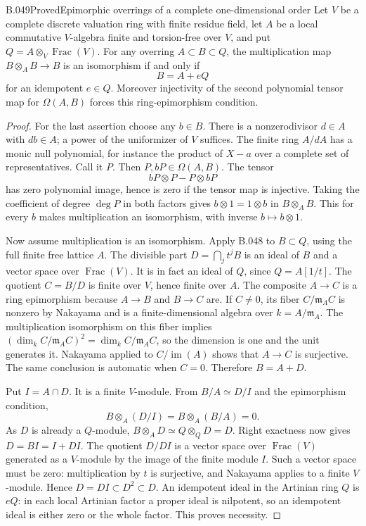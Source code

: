 \begin{saresult}{B.049}{Proved}{Epimorphic overrings of a complete one-dimensional order}
Let $V$ be a complete discrete valuation ring with finite
residue field, let $A$ be a local commutative $V$-algebra
finite and torsion-free over $V$, and put
$Q=A\otimes_V\operatorname{Frac}(V)$.
For any overring $A\subset B\subset Q$, the multiplication
map $B\otimes_A B\to B$ is an isomorphism if and only if
\[
                            B=A+eQ
\]
for an idempotent $e\in Q$. Moreover injectivity of the
second polynomial tensor map for $\Omega(A,B)$ forces
this ring-epimorphism condition.
\end{saresult}
\begin{proof}
For the last assertion choose any $b\in B$. There is
a nonzerodivisor $d\in A$ with $db\in A$; a power
of the uniformizer of $V$ suffices. The finite ring
$A/dA$ has a monic null polynomial, for instance the
product of $X-a$ over a complete set of representatives.
Call it $P$. Then $P,bP\in\Omega(A,B)$. The tensor
\[
                       bP\otimes P-P\otimes bP
\]
has zero polynomial image, hence is zero if the tensor
map is injective. Taking the coefficient of degree
$\deg P$ in both factors gives
$b\otimes1=1\otimes b$ in $B\otimes_A B$.
This for every $b$ makes multiplication an isomorphism,
with inverse $b\mapsto b\otimes1$.

Now assume multiplication is an isomorphism.
Apply B.048 to $B\subset Q$, using the full finite
free lattice $A$. The divisible part
$D=\bigcap_j t^jB$ is an ideal of $B$ and a vector
space over $\operatorname{Frac}(V)$. It is in fact
an ideal of $Q$, since $Q=A[1/t]$. The quotient
$C=B/D$ is finite over $V$, hence finite over $A$.
The composite $A\to C$ is a ring epimorphism because
$A\to B$ and $B\to C$ are. If $C\ne0$, its fiber
$C/\mathfrak m_A C$ is nonzero by Nakayama and is a
finite-dimensional algebra over $k=A/\mathfrak m_A$.
The multiplication isomorphism on this fiber implies
$(\dim_k C/\mathfrak m_A C)^2=\dim_k C/\mathfrak m_A C$,
so the dimension is one and the unit generates it.
Nakayama applied to $C/\operatorname{im}(A)$ shows
that $A\to C$ is surjective. The same conclusion is
automatic when $C=0$. Therefore $B=A+D$.

Put $I=A\cap D$. It is a finite $V$-module. From
$B/A\simeq D/I$ and the epimorphism condition,
\[
              B\otimes_A(D/I)=B\otimes_A(B/A)=0.
\]
As $D$ is already a $Q$-module,
$B\otimes_A D\simeq Q\otimes_QD=D$.
Right exactness now gives $D=BI=I+DI$.
The quotient $D/DI$ is a vector space over
$\operatorname{Frac}(V)$ generated as a $V$-module
by the image of the finite module $I$. Such a vector
space must be zero: multiplication by $t$ is
surjective, and Nakayama applies to a finite
$V$-module. Hence $D=DI\subset D^2\subset D$.
An idempotent ideal in the Artinian ring $Q$ is
$eQ$: in each local Artinian factor a proper ideal
is nilpotent, so an idempotent ideal is either zero
or the whole factor. This proves necessity.


\end{proof}
